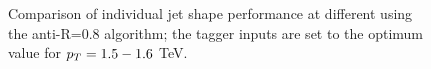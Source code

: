 \begin{figure}
\begin{center}
\caption{Comparison of individual jet shape performance at different \pt using the anti-\kT R=0.8 algorithm; the tagger inputs are set to the optimum value for $p_T=1.5-1.6$ TeV.}
\label{fig:ptcomparison_singleshape_top_optOnce}
\end{center}
\end{figure}

